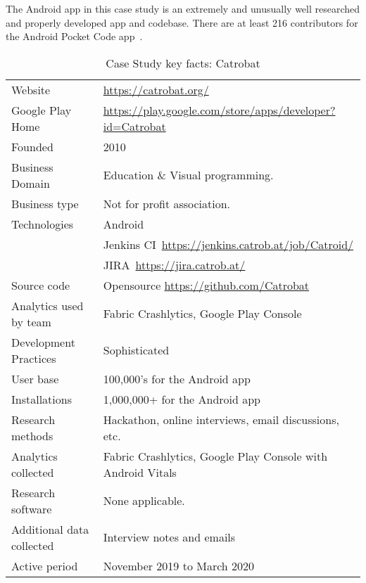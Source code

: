The Android app in this case study is an extremely and unusually well researched and properly developed app and codebase.  There are at least 216 contributors for the Android Pocket Code app~\citep{github_catroid}.

{\renewcommand{\arraystretch}{0.8}%
\begin{table}[htbp!]
    \centering
    \small
    \setlength{\tabcolsep}{6pt}
    \begin{tabular}{lp{11cm}}
       \toprule
       Website &\url{https://catrobat.org/} \\
       Google Play Home & \url{https://play.google.com/store/apps/developer?id=Catrobat} \\
       Founded & 2010 \\
       Business Domain & Education \& Visual programming. \\
       Business type & Not for profit association. \\
       Technologies  & Android \\
       & Jenkins CI~\url{https://jenkins.catrob.at/job/Catroid/}  \\
       & JIRA~\url{https://jira.catrob.at/} \\
       Source code  & Opensource \url{https://github.com/Catrobat} \\
       Analytics used by team & Fabric Crashlytics, Google Play Console \\
       Development Practices & Sophisticated~\footnotemark \\
       \midrule
       User base & 100,000's for the Android app \\
       Installations & 1,000,000+ for the Android app \\
       \midrule
       Research methods &Hackathon, online interviews, email discussions, etc. \\
       Analytics collected &Fabric Crashlytics, Google Play Console with Android Vitals \\
       Research software & None applicable. \\
       Additional data collected &Interview notes and emails \\
       Active period & November 2019 to March 2020 \\
       \bottomrule
    \end{tabular}
    \caption{Case Study key facts: Catrobat}
    \label{tab:blank_case_study_anaytics_overview}
\end{table}
}

